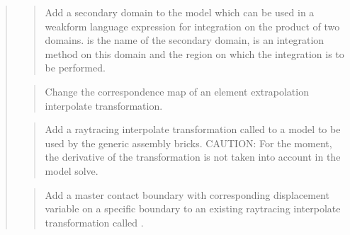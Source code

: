 \documentclass[a4paper,11pt,english]{sphinxmanual}
\begin{document}
\begin{quote}
\begin{quote}

Add a secondary domain to the model which can be used in a weak\sphinxhyphen{}form language expression for integration on the product of two domains.  is the name
of the secondary domain,  is an integration method on this domain
and  the region on which the integration is to be performed.
\end{quote}

\begin{quote}

Change the correspondence map of an element extrapolation interpolate
transformation.
\end{quote}

\begin{quote}

Add a raytracing interpolate transformation called  to a model
to be used by the generic assembly bricks.
CAUTION: For the moment, the derivative of the
transformation is not taken into account in the model solve.
\end{quote}

\begin{quote}

Add a master contact boundary with corresponding displacement variable
 on a specific boundary  to an existing raytracing
interpolate transformation called .
\end{quote}

\begin{quote}


\end{quote}
\end{quote}
\end{document}
